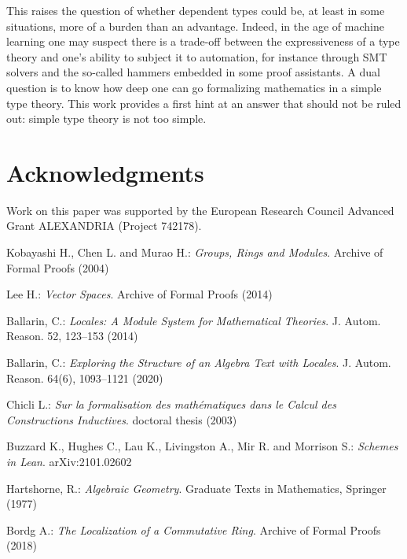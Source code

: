 \documentclass[12pt]{scrartcl}
\begin{document}
This raises the question of whether dependent types could be, at least in some situations, more of a burden than an advantage. Indeed, in the age of machine learning one may suspect there is a trade-off between the expressiveness of a type theory and one's ability to subject it to automation, for instance through SMT solvers and the so-called hammers embedded in some proof assistants. A dual question is to know how deep one can go formalizing mathematics in a simple type theory. This work provides a first hint at an answer that should not be ruled out: simple type theory is not too simple.       

\section*{Acknowledgments}

Work on this paper was supported by the European Research Council Advanced Grant ALEXANDRIA (Project 742178).  			


\begin{thebibliography}{}
	
	Kobayashi H., Chen L. and Murao H.:
	\newblock \textit{Groups, Rings and Modules}.
	\newblock Archive of Formal Proofs (2004)
	
	Lee H.:
	\newblock \textit{Vector Spaces}.
	\newblock Archive of Formal Proofs (2014)
	
	Ballarin, C.: 
	\newblock \textit{Locales: A Module System for Mathematical Theories}.
	\newblock J. Autom. Reason. 52, 123–153 (2014)
	
	Ballarin, C.:
	\newblock \textit{Exploring the Structure of an Algebra Text with Locales}. 
	\newblock J. Autom. Reason. 64(6), 1093–1121 (2020)
	
	Chicli L.:
	\newblock \textit{Sur la formalisation des math\'ematiques dans le Calcul des Constructions Inductives}.
	\newblock doctoral thesis (2003)
	
	Buzzard K., Hughes C., Lau K., Livingston A., Mir R. and Morrison S.:
	\newblock \textit{Schemes in Lean}.
	\newblock arXiv:2101.02602
	
	Hartshorne, R.:
	\newblock \textit{Algebraic Geometry}.
	\newblock Graduate Texts in Mathematics, Springer (1977)
	
	Bordg A.:
	\newblock \textit{The Localization of a Commutative Ring}.
	\newblock Archive of Formal Proofs (2018)
	
\end{thebibliography}

					

		
\end{document}
